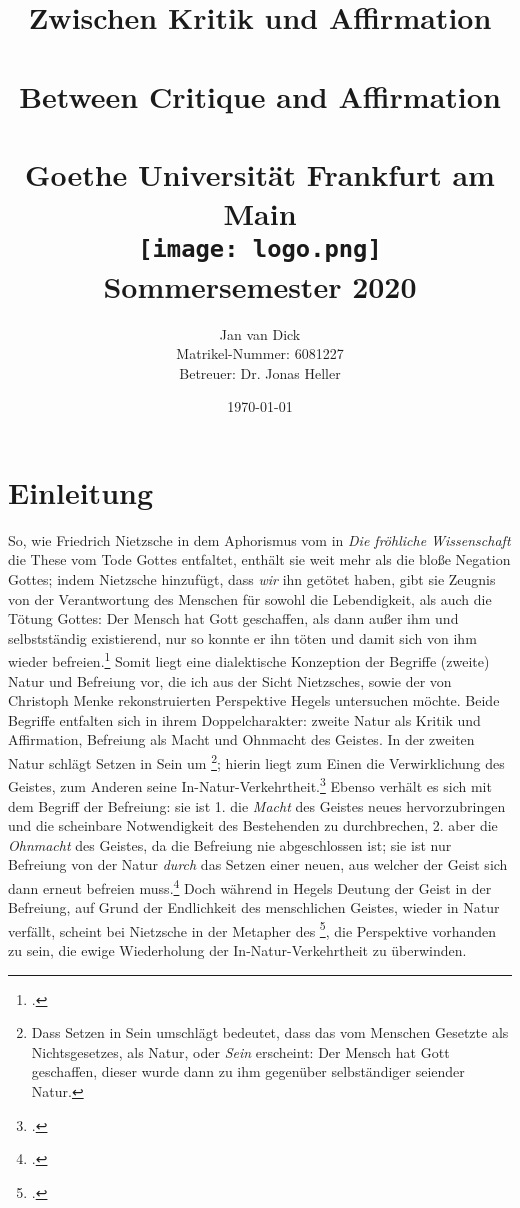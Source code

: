 \documentclass[12pt, a4paper, openany]{report}
\title{
    {\textbf{Zwischen Kritik und Affirmation}}\\ 
    {\large \color{darkgray}{Zweite Natur und Befreiung bei Hegel und Nietzsche}}\\
    {\bigskip}
    {\textbf{Between Critique and Affirmation}}\\
    {\large \color{darkgray}{Second Nature and Liberation in the Philosophies of Hegel and Nietzsche}}\\
    {\bigskip}
    {\large Goethe Universität Frankfurt am Main}\\
    {\bigskip}    
    {\bigskip}
    {\bigskip}    
    {\texttt{[image: logo.png]}}\\
    {\bigskip}    
    {Sommersemester 2020}\\
}
\author{
    {Jan van Dick}\\
    {Matrikel-Nummer: 6081227}\\
    {Betreuer: Dr. Jonas Heller}
}
\date{\today}
\begin{document}
\maketitle
\frontmatter

\onehalfspacing
\tableofcontents

\mainmatter

\chapter{Einleitung}
So, wie Friedrich Nietzsche in dem Aphorismus vom  in \emph{Die fröhliche Wissenschaft} die These vom Tode Gottes entfaltet, enthält sie weit mehr als die bloße Negation Gottes;
indem Nietzsche hinzufügt, dass \emph{wir} ihn getötet haben, gibt sie Zeugnis von der Verantwortung des Menschen für sowohl die Lebendigkeit, als auch die Tötung Gottes: 
Der Mensch hat Gott geschaffen, als dann außer ihm und selbstständig existierend, nur so konnte er ihn töten und damit sich von ihm wieder befreien.\footcite[Vgl.][481]{nietzsche_morgenrote_1999}
Somit liegt eine dialektische Konzeption der Begriffe (zweite) Natur und Befreiung vor, die ich aus der Sicht Nietzsches, sowie der von Christoph Menke rekonstruierten Perspektive Hegels untersuchen möchte.
Beide Begriffe entfalten sich in ihrem Doppelcharakter: zweite Natur als Kritik und Affirmation, Befreiung als Macht und Ohnmacht des Geistes.
In der zweiten Natur schlägt Setzen in Sein um%
\footnote{
    Dass Setzen in Sein umschlägt bedeutet, dass das vom Menschen Gesetzte als Nichtsgesetzes, als Natur, oder \emph{Sein} erscheint: 
    Der Mensch hat Gott geschaffen, dieser wurde dann zu ihm gegenüber selbständiger seiender Natur. 
}; 
hierin liegt zum Einen die Verwirklichung des Geistes, zum Anderen seine In-Natur-Verkehrtheit.\footcite[Vgl.][145]{menke_autonomie_2018}
Ebenso verhält es sich mit dem Begriff der Befreiung: 
sie ist 1. die \emph{Macht} des Geistes neues hervorzubringen und die scheinbare Notwendigkeit des Bestehenden zu durchbrechen, 
2. aber die \emph{Ohnmacht} des Geistes, da die Befreiung nie abgeschlossen ist; 
sie ist nur Befreiung von der Natur \emph{durch} das Setzen einer neuen, aus welcher der Geist sich dann erneut befreien muss.\footcite[Vgl.][80]{menke_autonomie_2018}
Doch während in Hegels Deutung der Geist in der Befreiung, auf Grund der Endlichkeit des menschlichen Geistes, wieder in Natur verfällt, scheint bei Nietzsche in der Metapher des \footcite[Vgl.][574]{nietzsche_morgenrote_1999}, die Perspektive vorhanden zu sein, die ewige Wiederholung der In-Natur-Verkehrtheit zu überwinden.
\end{document}
